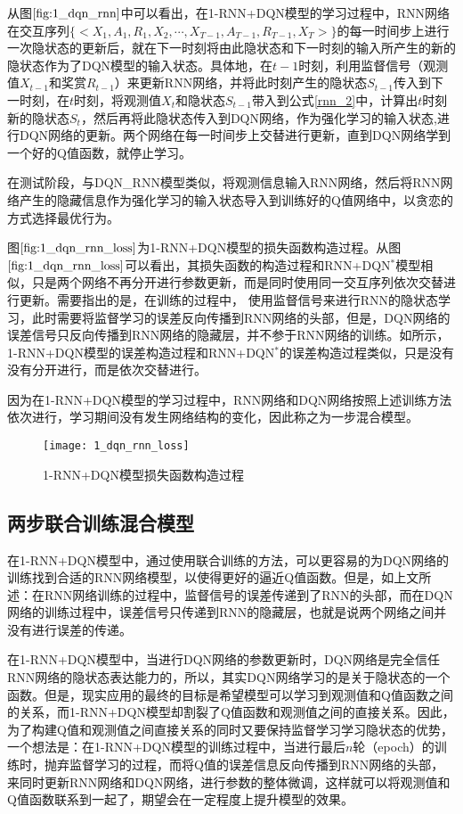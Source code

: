 从图$\ref{fig:1_dqn_rnn}$中可以看出，在1-RNN+DQN模型的学习过程中，RNN网络在交互序列$\{<X_{1}, A_{1}, R_{1}, X_{2}, \cdots, X_{T-1}, A_{T-1}, R_{T-1},X_{T}>\}$的每一时间步上进行一次隐状态的更新后，就在下一时刻将由此隐状态和下一时刻的输入所产生的新的隐状态作为了DQN模型的输入状态。具体地，在$t-1$时刻，利用监督信号（观测值$X_{t-1}$和奖赏$R_{t-1}$）来更新RNN网络，并将此时刻产生的隐状态$S_{t-1}$传入到下一时刻，在$t$时刻，将观测值$X_{t}$和隐状态$S_{t-1}$带入到公式\eqref{rnn_2}中，计算出$t$时刻新的隐状态$S_{t}$，然后再将此隐状态传入到DQN网络，作为强化学习的输入状态,进行DQN网络的更新。两个网络在每一时间步上交替进行更新，直到DQN网络学到一个好的Q值函数，就停止学习。

在测试阶段，与DQN\_RNN模型类似，将观测信息输入RNN网络，然后将RNN网络产生的隐藏信息作为强化学习的输入状态导入到训练好的Q值网络中，以贪恋的方式选择最优行为。


图$\ref{fig:1_dqn_rnn_loss}$为1-RNN+DQN模型的损失函数构造过程。从图$\ref{fig:1_dqn_rnn_loss}$可以看出，其损失函数的构造过程和RNN+DQN$^{*}$模型相似，只是两个网络不再分开进行参数更新，而是同时使用同一交互序列依次交替进行更新。需要指出的是，在训练的过程中，
使用监督信号来进行RNN的隐状态学习，此时需要将监督学习的误差反向传播到RNN网络的头部，但是，DQN网络的误差信号只反向传播到RNN网络的隐藏层，并不参于RNN网络的训练。如所示，1-RNN+DQN模型的误差构造过程和RNN+DQN$^{*}$的误差构造过程类似，只是没有没有分开进行，而是依次交替进行。

因为在1-RNN+DQN模型的学习过程中，RNN网络和DQN网络按照上述训练方法依次进行，学习期间没有发生网络结构的变化，因此称之为一步混合模型。
\begin{figure}[htbp]
\centering
\texttt{[image: 1\_dqn\_rnn\_loss]}
\caption{1-RNN+DQN模型损失函数构造过程}
\label{fig:1_dqn_rnn_loss}
\end{figure}

\subsection{两步联合训练混合模型}
在1-RNN+DQN模型中，通过使用联合训练的方法，可以更容易的为DQN网络的训练找到合适的RNN网络模型，以使得更好的逼近Q值函数。但是，如上文所述：在RNN网络训练的过程中，监督信号的误差传递到了RNN的头部，而在DQN网络的训练过程中，误差信号只传递到RNN的隐藏层，也就是说两个网络之间并没有进行误差的传递。

在1-RNN+DQN模型中，当进行DQN网络的参数更新时，DQN网络是完全信任RNN网络的隐状态表达能力的，所以，其实DQN网络学习的是关于隐状态的一个函数。但是，现实应用的最终的目标是希望模型可以学习到观测值和Q值函数之间的关系，而1-RNN+DQN模型却割裂了Q值函数和观测值之间的直接关系。因此，为了构建Q值和观测值之间直接关系的同时又要保持监督学习学习隐状态的优势，一个想法是：在1-RNN+DQN模型的训练过程中，当进行最后$n$轮（epoch）的训练时，抛弃监督学习的过程，而将Q值的误差信息反向传播到RNN网络的头部，来同时更新RNN网络和DQN网络，进行参数的整体微调，这样就可以将观测值和Q值函数联系到一起了，期望会在一定程度上提升模型的效果。

